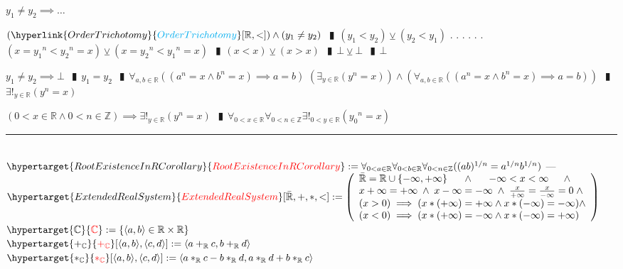 \documentclass{book}
\newcommand{\df}[1]{\hypertarget{#1}{\textcolor{red}{#1}}}
\newcommand{\rf}[1]{\hyperlink{#1}{\textcolor{cyan}{#1}}}
\newcommand{\abr}{:=}
\newcommand{\cont}{\phantom{.}. . .\phantom{.}}
\newcommand{\pipe}{$\phantom{(}\vrectangleblack\phantom{)}$}
\begin{document}
\begin{enumerate}
\begin{enumerate}
    \lit $y_1 \neq y_2 \implies \ldots$
    \begin{enumerate}
      \lit $(\rf{OrderTrichotomy}[\mathbb{R}, <]) \land (y_1 \neq y_2)$ \pipe $(y_1 < y_2) \veebar (y_2 < y_1)$ \cont
      \lit \cont $(x = {y_1}^n < {y_2}^n = x) \veebar (x = {y_2}^n < {y_1}^n = x)$ \pipe $(x < x) \veebar (x > x)$ \pipe $\bot \veebar \bot$ \pipe $\bot$
    \end{enumerate}
    \lit $y_1 \neq y_2 \implies \bot$ \pipe $y_1 = y_2$ \pipe $\forall_{a, b \in \mathbb{R}}((a^n = x \land b^n = x) \implies a = b)$
    \lit $(\exists_{y \in \mathbb{R}}(y^n = x)) \land (\forall_{a, b \in \mathbb{R}}((a^n = x \land b^n = x) \implies a = b))$ \pipe $\exists!_{y \in \mathbb{R}}(y^n = x)$
  \end{enumerate}
  \lit $(0 < x \in \mathbb{R} \land 0 < n \in \mathbb{Z}) \implies \exists!_{y \in \mathbb{R}}(y^n = x)$ \pipe $\forall_{0 < x \in \mathbb{R}} \forall_{0 < n \in \mathbb{Z}} \exists!_{0 < y \in \mathbb{R}}({y_0}^n = x)$
\end{enumerate} \vspace{.75mm} \hrule \vspace{.75mm} \ \\ 

$\df{RootExistenceInRCorollary} \abr \forall_{0 < a \in \mathbb{R}} \forall_{0 < b \in \mathbb{R}} \forall_{0 < n \in \mathbb{Z}}((a b)^{1 / n} = a^{1 / n} b^{1 / n})$    \phantom{TODO}--- \\

$\df{ExtendedRealSystem}[\bar{\mathbb{R}}, +, *, <] \abr \left(\begin{array}{ll}
  \bar{\mathbb{R}} = \mathbb{R} \cup \{-\infty, +\infty\} \hfill \land \hfill -\infty < x < \infty \hfill \land \hfill \\
  x + \infty = +\infty \hfill \land \hfill x - \infty = -\infty \hfill \land \hfill \frac{x}{+\infty} = \frac{x}{-\infty} = 0 \hfill \land \hfill \\
  (x > 0) \implies (x * (+\infty) = +\infty \land x *(-\infty) = -\infty) \hfill \land \hfill \\
  (x < 0) \implies (x * (+\infty) = -\infty \land x *(-\infty) = +\infty)
\end{array}\right)$ \\

$\df{\mathbb{C}} \abr \{\langle a, b \rangle \in \mathbb{R} \times \mathbb{R}\}$ \\
$\df{+_{\mathbb{C}}}[\langle a, b \rangle, \langle c, d \rangle] \abr \langle a +_{\mathbb{R}} c, b +_{\mathbb{R}} d \rangle$ \\
$\df{*_{\mathbb{C}}}[\langle a, b \rangle, \langle c, d \rangle] \abr \langle a *_{\mathbb{R}} c - b *_{\mathbb{R}} d, a *_{\mathbb{R}} d + b *_{\mathbb{R}} c \rangle$ \\
\end{document}
